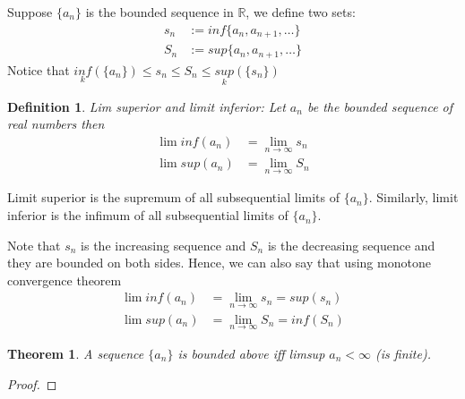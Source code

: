 \documentclass[12pt]{report}
\newtheorem{thm}{Theorem}
\newtheorem{defn}{Definition}
\begin{document}
Suppose $\{a_n\}$ is the bounded sequence in $\mathbb{R}$, we define two sets: 
\begin{align*}
    s_n &:= inf\{a_n, a_{n+1}, \dots \}\\
    S_n &:= sup\{a_n, a_{n+1}, \dots \}
\end{align*}
Notice that $ \underset{k}{inf}(\{a_n\}) \leq s_n \leq S_n \leq \underset{k}{sup}(\{s_n\})$
\begin{defn}
    Lim superior and limit inferior: Let $a_n$ be the bounded sequence of real numbers then
    \begin{align*}
        \lim inf(a_n) &= \lim_{n\to \infty} s_n\\
        \lim sup(a_n) &= \lim_{n\to \infty} S_n
    \end{align*}
\end{defn}
Limit superior is the supremum of all subsequential limits of $\{a_n\}$. Similarly, limit inferior is the infimum of all subsequential limits of $\{a_n\}$.

Note that $s_n$ is the increasing sequence and $S_n$ is the decreasing sequence and they are bounded on both sides. Hence, we can also say that using monotone convergence theorem
\begin{align*}
    \lim inf(a_n) &= \lim_{n\to \infty} s_n = sup(s_n)\\
    \lim sup(a_n) &= \lim_{n\to \infty} S_n = inf(S_n)
\end{align*}
\begin{thm}
    A sequence $\{a_n\}$ is bounded above iff limsup $a_n < \infty$ (is finite).
\end{thm}
\begin{proof}
    
\end{proof}
\end{document}
